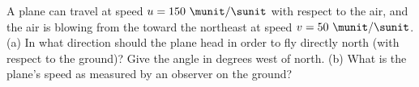 A plane can travel at speed $u=150\ \munit/\sunit$ with respect to the air, and
the air is blowing from the toward the northeast at speed
$v = 50\ \munit/\sunit$.\\
%
(a) In what direction should the plane head in order to fly directly
north (with respect to the ground)? Give the angle in degrees west of
north.\answercheck\hwendpart
%
(b) What is the plane's speed as measured by an observer on the
ground?\answercheck
